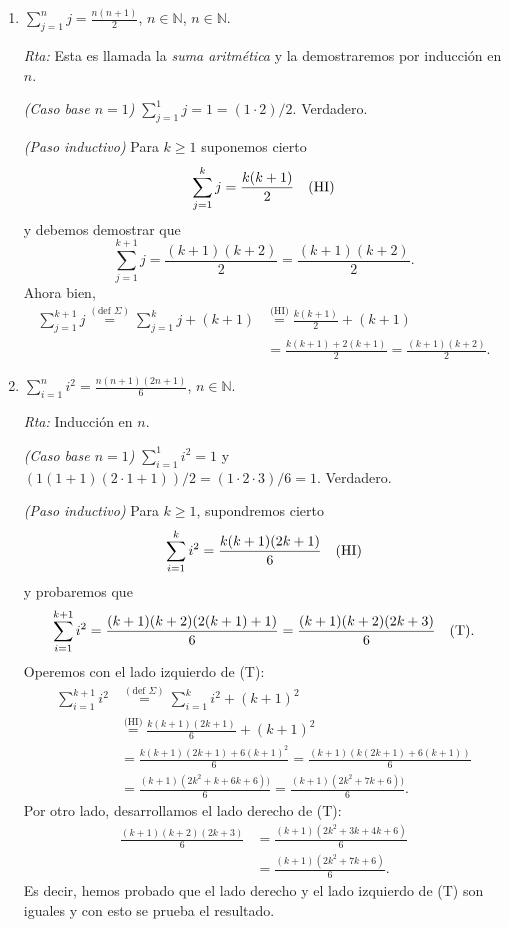 \documentclass[12pt,spanish,makeidx]{amsbook}
\newcommand{\rta}{\noindent\textit{Rta: }}
\begin{document}
\begin{enumerate}
\begin{enumerate}
			
			\item\label{ej-serie-aritmetica}  $\displaystyle{ \sum_{j=1}^n j = \frac{n(n+1)}{2}}$, $n\in \mathbb N$, $n\in \mathbb N$.
			
			\rta Esta es llamada la \textit{suma aritmética} y la demostraremos por inducción en $n$.
			
			\textit{(Caso base $n=1$) } $ \sum_{j=1}^1 j = 1 = (1 \cdot 2)/2$. Verdadero. 
			
			\textit{(Paso inductivo) } Para $k \ge 1$ suponemos cierto $$\sum_{j=1}^k j = \frac{k(k+1)}{2} \text{\quad (HI)}$$  y  debemos demostrar  que $$\sum_{j=1}^{k+1} j = \frac{(k+1)(k+2)}{2} = \frac{(k+1)(k+2)}{2}.$$ Ahora bien,
			\begin{align*}
				\sum_{j=1}^{k+1} j \overset{(\text{def } \Sigma)}{=} \sum_{j=1}^k j + (k+1)&  \overset{\text{(HI)}}{=} \frac{k(k+1)}{2} + (k+1) \\&= \frac{k(k+1) +2(k+1)}{2} = \frac{(k+1)(k +2)}{2}. 
			\end{align*}
			
			\item\label{ej-sum-i2}  $\displaystyle{ \sum_{i=1}^n i^2 = \frac{n(n+1)(2n+1)}{6}}$, $n\in \mathbb N$.
			
			\rta Inducción en $n$.
			
			\textit{(Caso base $n=1$) } $ \sum_{i=1}^1 i^2 = 1$ y $(1  (1+1)  (2\cdot 1 + 1))/2 = (1 \cdot 2 \cdot 3)/6=1$. Verdadero.  
			
			\textit{(Paso inductivo) } Para  $k \ge 1$,  supondremos cierto 
			$$\sum_{i=1}^{k} i^2 = \frac{k(k+1)(2k+1)}{6} \text{\quad (HI)}$$
			y probaremos que 
			$$\sum_{i=1}^{k+1} i^2 = \frac{(k+1)(k+2)(2(k+1)+1)}{6} = \frac{(k+1)(k+2)(2k+3)}{6} \text{\quad (T)}.$$ 
			Operemos con el lado izquierdo de (T):
			\begin{align*}
			\sum_{i=1}^{k+1} i^2 &\overset{(\text{def } \Sigma)}{=} \sum_{i=1}^{k} i^2 + (k+1)^2 \\ &\overset{\text{(HI)}}{=} \frac{k(k+1)(2k+1)}{6}  + (k+1)^2 \\ &=   \frac{k(k+1)(2k+1) + 6(k+1)^2}{6} = \frac{(k+1)(k(2k+1) + 6(k+1))}{6} \\ &= \frac{(k+1)(2k^2+k + 6k+6))}{6} =  \frac{(k+1)(2k^2+7k+6))}{6}.
			\end{align*}
			Por otro lado,  desarrollamos el lado derecho de (T): 
			\begin{align*}
				\frac{(k+1)(k+2)(2k+3)}{6} &= \frac{(k+1)(2k^2+3k +4k +6)}{6} \\&= \frac{(k+1)(2k^2+7k +6)}{6}.
			\end{align*}
			Es decir,  hemos probado que el lado derecho y el lado izquierdo de (T) son iguales y con esto se prueba el resultado. 
			

\end{enumerate}
\end{enumerate}
\end{document}
